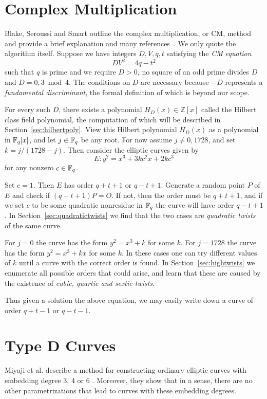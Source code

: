 \section {\label{sec:cm}Complex Multiplication}

Blake, Seroussi and Smart outline the complex multiplication, or CM,
method and provide a brief explanation and many
references~\cite{bss}. We only quote the algorithm itself.
Suppose we have integers $D, V, q, t$ satisfying the \emph{CM equation}
\[ D V^2 = 4 q - t^2 \]
such that $q$ is prime and we require $D > 0$, no
square of an odd prime divides $D$ and
$D = 0, 3 \bmod 4$. The conditions on $D$ are necessary
because $-D$ represents a \emph{fundamental discriminant},
the formal definition of which is beyond our scope.

For every such $D$, there exists a polynomial $H_D(x) \in \mathbb{Z}[x]$
called the Hilbert class field polynomial, the computation of which
will be described in Section~\ref{sec:hilbertpoly}.
View this Hilbert polynomial $H_D(x)$ as a polynomial in $\mathbb{F}_q[x]$,
and let $j \in \mathbb{F}_q$ be any root. For now assume $j \ne 0, 1728$,
and set
$k = j / (1728 - j)$. Then consider the elliptic curves given by
\[ E: y^2 = x^3 + 3 k c^2 x + 2 k c^3 \]
for any nonzero $c \in \mathbb{F}_q$.

Set $c = 1$. Then $E$ has order $q + t + 1$ or $q - t + 1$.
Generate a random point $P$ of $E$ and check if
$(q-t+1)P = O$. If not, then the order must be $q + t + 1$,
and if we set $c$ to be some quadratic nonresidue in $\mathbb{F}_q$ the
curve will have order $q - t + 1$.
In Section~\ref{sec:quadratictwists} we find that the two cases
are \emph{quadratic twists} of the same curve.

For $j = 0$ the curve has the form $y^2 = x^3 + k$ for some $k$.
For $j = 1728$ the curve has the form $y^2 = x^3 + k x$ for some $k$.
In these cases one can try different values of $k$ until a curve
with the correct order is found.
In Section~\ref{sec:hightwists} we enumerate all possible orders
that could arise, and learn that these are caused by the existence
of \emph{cubic, quartic and sextic twists}.

Thus given a solution the above equation, we may easily write down
a curve of order $q+t-1$ or $q-t-1$.

\section {Type D Curves}

Miyaji et al. describe a method for constructing ordinary elliptic
curves with embedding degree 3, 4 or 6 \cite{mnt}. Moreover, they show
that in a sense, there are no other parametrizations that lead to curves
with these embedding degrees.


